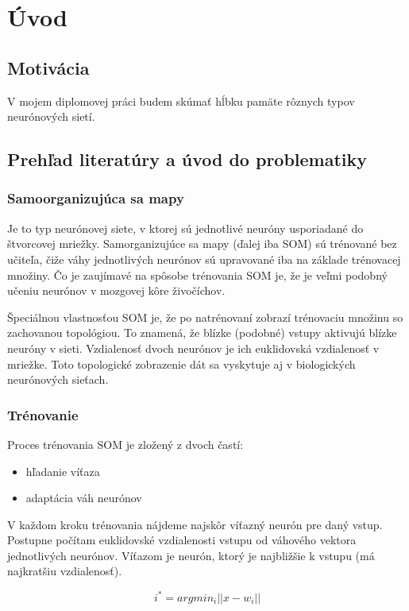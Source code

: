 \chapter{Úvod}

\section{Motivácia}
V mojem diplomovej práci budem skúmať hĺbku pamäte rôznych typov neurónových sietí.
% 

\section{Prehľad literatúry a úvod do problematiky}
\subsection{Samoorganizujúca sa mapy}
Je to typ neurónovej siete, v ktorej sú jednotlivé neuróny usporiadané do štvorcovej mriežky. Samorganizujúce sa mapy (ďalej iba SOM) sú trénované bez učiteľa, čiže váhy jednotlivých neurónov sú upravované iba na základe trénovacej množiny. Čo je zaujímavé na spôsobe trénovania SOM je, že je veľmi podobný učeniu neurónov v mozgovej kôre živočíchov.

Špeciálnou vlastnosťou SOM je, že po natrénovaní zobrazí trénovaciu množinu so zachovanou topológiou. To znamená, že blízke (podobné) vstupy aktivujú blízke neuróny v sieti. Vzdialenosť dvoch neurónov je ich euklidovská vzdialenosť v mriežke. Toto topologické zobrazenie dát sa vyskytuje aj v biologických neurónových sieťach.

\subsection{Trénovanie}
Proces trénovania SOM je zložený z dvoch častí:
\begin{itemize}
\item hľadanie víťaza
\item adaptácia váh neurónov
\end{itemize}

V každom kroku trénovania nájdeme najskôr víťazný neurón pre daný vstup. Postupne počítam euklidovské vzdialenosti vstupu od váhového vektora jednotlivých neurónov. Víťazom je neurón, ktorý je najbližšie k vstupu (má najkratšiu vzdialenosť).

\begin{equation}
i^* = argmin_i||x-w_i|| 
\end{equation}

